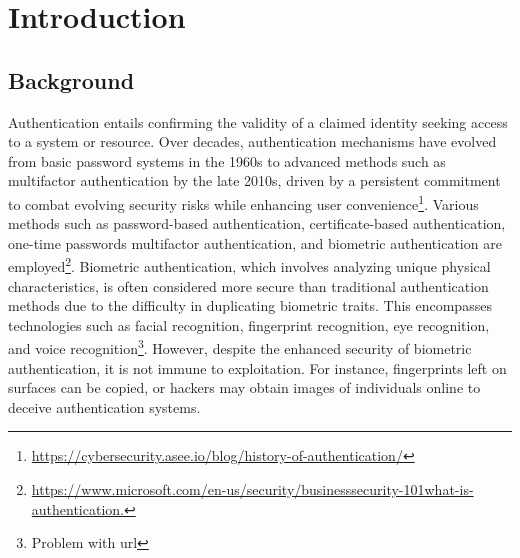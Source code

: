 \section{Introduction}

\subsection{Background}

Authentication entails confirming the validity of a claimed identity seeking access to a system or resource. Over decades, authentication mechanisms have evolved from basic password systems in the 1960s to advanced methods such as multifactor authentication by the late 2010s, driven by a persistent commitment to combat evolving security risks while enhancing user convenience\footnote{\url{https://cybersecurity.asee.io/blog/history-of-authentication/}}. Various methods such as password-based authentication, certificate-based authentication, one-time passwords multifactor authentication, and biometric authentication are employed\footnote{\url{https://www.microsoft.com/en-us/security/businesssecurity-101what-is-authentication.}}. Biometric authentication, which involves analyzing unique physical characteristics, is often considered more secure than traditional authentication methods due to the difficulty in duplicating biometric traits. This encompasses technologies such as facial recognition, fingerprint recognition, eye recognition, and voice recognition\footnote{Problem with url}. %
\newline However, despite the enhanced security of biometric authentication, it is not immune to exploitation. For instance, fingerprints left on surfaces can be copied, or hackers may obtain images of individuals online to deceive authentication systems. 

